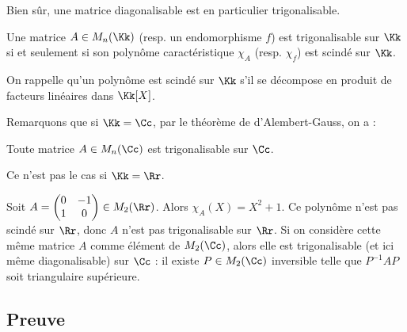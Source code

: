 \documentclass[12pt, class=report,crop=false]{standalone}
\begin{document}
Bien sûr, une matrice diagonalisable est en particulier trigonalisable.


\begin{theoreme}
Une matrice $A \in M_n(\Kk)$ (resp. un endomorphisme $f$) est trigonalisable sur $\Kk$ si et seulement 
si son polynôme caractéristique $\chi_A$ (resp. $\chi_f$) est scindé sur $\Kk$.
\end{theoreme} 

On rappelle qu'un polynôme est scindé sur $\Kk$ s'il se décompose en produit de facteurs linéaires dans $\Kk[X]$.

Remarquons que si $\Kk=\Cc$, par le théorème de d'Alembert-Gauss, on a : 
\begin{corollaire}
Toute matrice $A \in M_n(\Cc)$ est trigonalisable sur $\Cc$.
\end{corollaire}

Ce n'est pas le cas si $\Kk=\Rr$.
\begin{exemple}
Soit $A = 
\begin{pmatrix}
0&-1\\
1&0
\end{pmatrix} \in M_2(\Rr)$.
Alors $\chi_A(X) = X^2+1$. Ce polynôme n'est pas scindé sur $\Rr$, donc $A$ n'est pas trigonalisable sur $\Rr$. Si on considère cette même matrice $A$ comme élément de $M_2(\Cc)$, alors elle est trigonalisable (et ici même diagonalisable) sur $\Cc$ : il existe $P \in M_2(\Cc)$ inversible telle que $P^{-1}AP$ soit triangulaire supérieure. 
\end{exemple}



\subsection{Preuve}
\end{document}
